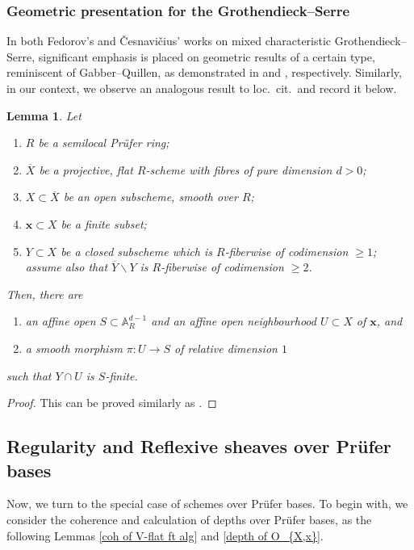 \documentclass[JEP,XML,SOM,Unicode,published]{cedram}
\newenvironment{enumeratei}
{\bgroup\def\theenumi{\roman{enumi}}\def\theenumii{\arabic{enumii}}\begin{enumerate}}
{\end{enumerate}\egroup}
\let\backslash\smallsetminus
\newcommand{\bpf}{\begin{proof}}
\newcommand{\epf}{\end{proof}}
\newcommand{\blem}{\begin{lemma}}
\newcommand{\elem}{\end{lemma}}
\newcommand{\benumr}{\begin{enumeratei}}
\newcommand{\eenumr}{\end{enumeratei}}
\theoremstyle{plain}
\newtheorem{lemma}[subsection]{Lemma}
\theoremstyle{definition}
\begin{document}
\subsubsection{Geometric presentation for the Grothendieck--Serre}
In both Fedorov's and \v{C}esnavi\v{c}ius' works on mixed characteristic Grothendieck--Serre, significant emphasis is placed on geometric results of a certain type, reminiscent of Gabber--Quillen, as demonstrated in \cite[Prop.\,3.18]{Fed22b} and \cite[Var.\,3.7]{Ces22a}, respectively.
Similarly, in our context, we observe an analogous result to loc.~cit.\ and record it below.

\blem \label{Ces's Variant 3.7}
Let
\benumr
\item $R$ be a semilocal Prüfer ring;
\item $\overline{X}$ be a projective, flat $R$-scheme with fibres of pure dimension $d>0$;
\item $X\subset \overline{X}$ be an open subscheme, smooth over $R$;
\item $\textbf{x}\subset X$ be a finite subset;
\item $Y\subset X$ be a closed subscheme which is
$R$-fiberwise of codimension $\ge 1$; assume also that $\overline{Y}\backslash Y$ is $R$-fiberwise of codimension $\ge 2$.
\eenumr
\noindent
Then, there are
\benumr
\item an affine open $S\subset \mathbb{A}_R^{d-1}$ and an affine open neighbourhood $ U\subset X$ of $\textbf{x}$, and
\item a smooth morphism $\pi:U\to S$ of relative dimension $1$
\eenumr
\noindent
such that $Y \cap U$ is $S$-finite.
\elem
\bpf
This can be proved similarly as \cite[Var.\,3.7]{Ces22a}.
\epf

\subsection{Regularity and Reflexive sheaves over Prüfer bases}\label{subsec-Regularity and Reflexive sheaves over Prüfer bases}

Now, we turn to the special case of schemes over Prüfer bases.
To begin with, we consider the coherence and calculation of depths over Prüfer bases, as the following Lemmas \ref{coh of V-flat ft alg} and \ref{depth of O_{X,x}}.
\end{document}
